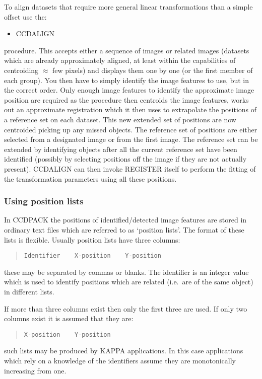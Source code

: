 \documentclass[twoside,11pt]{article}
\newcommand{\htmlref}[2]{#1}
\newcommand{\xref}[3]{#1}
\newcommand{\xlabel}[1]{}
\renewcommand{\_}{\texttt{\symbol{95}}}
\newenvironment{myquote}{\begin{quote}\begin{small}}{\end{small}\end{quote}}
\newcommand{\routine}[1]{{\sc #1}}
\newcommand{\xroutine}[1]{\htmlref{{\sc #1}}{#1}}
\begin{document}
To align datasets that require more general linear transformations
than a simple offset
use the:
\begin{itemize}
\item \xroutine{CCDALIGN}
\end{itemize}
procedure. This accepts either a sequence of images or related images
(datasets which are already approximately aligned, at least within the
capabilities of centroiding $\approx$ few pixels) and displays them one
by one (or the first member of each group). You then have to simply
identify the image features to use, but in the correct order. Only
enough image features to identify the approximate image position are
required as the  procedure then centroids the image features, works out
an approximate registration which it then uses to extrapolate the
positions of a reference set on each dataset. This new extended set of
positions are now centroided picking up any missed objects. The
reference set of positions are either selected from a designated image or
from the first image. The reference set can be extended by identifying
objects after all the current reference set have been identified
(possibly by selecting positions off the image if they are not actually
present).  \routine{CCDALIGN} can then invoke \routine{REGISTER} itself to
perform the fitting of the transformation parameters using all these
positions.


\subsubsection{\xlabel{usinglistsofpositions}Using position lists
               \label{using_position_lists}}

In CCDPACK the positions of identified/detected image features are
stored in ordinary text files which are referred to as `position lists'.
The format of these lists is flexible. Usually position lists have three
columns:
\begin{myquote}
\begin{verbatim}
Identifier    X-position    Y-position
\end{verbatim}
\end{myquote}
these may be separated by commas or blanks. The identifier is an
integer value which is used to identify positions which are related
(i.e.\ are of the same object) in different lists.

If more than three columns exist then only the first three are used.
If only two columns exist it is assumed that they are:
\begin{myquote}
\begin{verbatim}
X-position    Y-position
\end{verbatim}
\end{myquote}
such lists may be produced by \xref{KAPPA}{sun95}{} applications. In
this case applications which rely on a knowledge of the identifiers
assume they are monotonically increasing from one.
\end{document}
